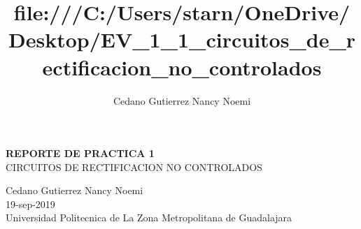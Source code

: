
\usepackage[utf8]{inputenc}
\usepackage{amsmath}
\usepackage{amsfonts}
\usepackage{amssymb}
\usepackage{makeidx}
\usepackage{graphicx}
\usepackage{lmodern}
\usepackage{kpfonts}
\usepackage{fourier}
\author{Cedano Gutierrez Nancy Noemi}
\title{file:///C:/Users/starn/OneDrive/Desktop/EV_1_1_circuitos_de_rectificacion_no_controlados}

\begin{center}
\textbf{REPORTE DE PRACTICA 1}\\
CIRCUITOS DE RECTIFICACION NO CONTROLADOS
\end{center}
\begin{center}
Cedano Gutierrez Nancy Noemi\\
19-sep-2019\\
Universidad Politecnica de La Zona Metropolitana de Guadalajara
\end{center}

